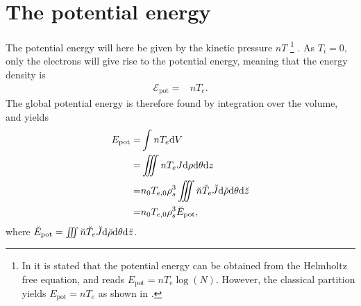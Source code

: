 %
\section{The potential energy}
%
The potential energy will here be given by the kinetic pressure $nT$
%
\footnote{In \cite{Wiesenberger2014} it is stated that the potential energy can be obtained from the Helmholtz free equation, and reads $E_{\text{pot}}=nT_e\log(N)$.
    However, the classical partition yields $E_{\text{pot}}=nT_e$ as shown in \cite{Kittel1980book}.}%
.
As $T_i=0$, only the electrons will give rise to the potential energy, meaning that the energy density is
%
\begin{align*}
    \mathcal{E}_{\text{pot}} =& nT_e.
\end{align*}
%
The global potential energy is therefore found by integration over the volume, and yields
%
\begin{align*}
    E_{\text{pot}}
    =& \int nT_e \text{d} V
    \\
    =& \iiint nT_e J \text{d}\rho \text{d}\theta \text{d} z
    \\
    =& n_0T_{e,0}\rho_s^3\iiint \breve{n}\breve{T}_e \breve{J} \text{d}\breve{\rho} \text{d}\theta \text{d} \breve{z}
    \\
    =& n_0T_{e,0}\rho_s^3\breve{E}_{\text{pot}},
\end{align*}
%
where $\breve{E}_{\text{pot}} = \iiint \breve{n}\breve{T}_e \breve{J} \text{d}\breve{\rho} \text{d}\theta \text{d} \breve{z}$.
